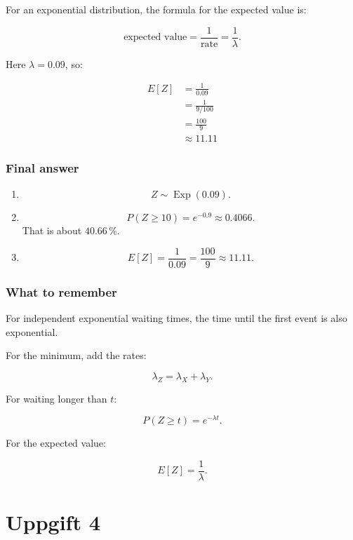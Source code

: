 \documentclass[10pt]{article}
\begin{document}
For an exponential distribution, the formula for the expected
value is:

\[
\text{expected value}
=\frac{1}{\text{rate}}
=\frac{1}{\lambda}.
\]

Here $\lambda=0.09$, so:

\begin{align*}
E[Z]
&=\frac{1}{0.09} \\[2mm]
&=\frac{1}{9/100} \\[2mm]
&=\frac{100}{9} \\[2mm]
&\approx 11.11
\end{align*}

\subsubsection*{Final answer}
\begin{enumerate}[label=\alph*)]
\item
\[
Z\sim \operatorname{Exp}(0.09).
\]

\item
\[
P(Z\geq 10)=e^{-0.9}\approx 0.4066.
\]
That is about $40.66\,\%$.

\item
\[
E[Z]=\frac{1}{0.09}
=\frac{100}{9}
\approx 11.11.
\]
\end{enumerate}

\subsubsection*{What to remember}
For independent exponential waiting times,
the time until the first event is also exponential.

For the minimum, add the rates:

\[
\lambda_Z=\lambda_X+\lambda_Y.
\]

For waiting longer than $t$:

\[
P(Z\geq t)=e^{-\lambda t}.
\]

For the expected value:

\[
E[Z]=\frac{1}{\lambda}.
\]

\section*{Uppgift 4}
\end{document}
